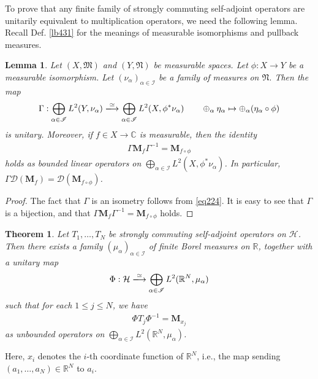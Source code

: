 \documentclass[12pt,b5paper,notitlepage]{article}
\theoremstyle{definition}
\theoremstyle{plain}
\newtheorem{thm}[df]{Theorem}
\newtheorem{lm}[df]{Lemma}
\newcommand{\fk}{\mathfrak}
\newcommand{\Dom}{\mathscr{D}}
\newcommand{\Cbb}{\mathbb C}
\newcommand{\Rbb}{\mathbb R}
\newcommand{\MH}{\mathcal H}
\newcommand{\SI}{\mathscr I}
\newcommand{\Mbf}{\mathbf M}
\numberwithin{equation}{section}
\begin{document}
To prove that any finite family of strongly commuting self-adjoint operators are unitarily equivalent to multiplication operators, we need the following lemma. Recall Def. \ref{lb431} for the meanings of measurable isomorphisms and pullback measures.


\begin{lm}\label{lb432}
Let $(X,\fk M)$ and $(Y,\fk N)$ be measurable spaces. Let $\phi:X\rightarrow Y$ be a measurable isomorphism. Let $(\nu_\alpha)_{\alpha\in\SI}$ be a family of measures on $\fk N$. Then the map
\begin{align*}
\Gamma:\bigoplus_{\alpha\in\SI}L^2(Y,\nu_\alpha)\xlongrightarrow{\simeq}\bigoplus_{\alpha\in\SI}L^2(X,\phi^*\nu_\alpha)\qquad \oplus_\alpha\eta_\alpha\mapsto \oplus_\alpha (\eta_\alpha\circ\phi)
\end{align*}
is unitary. Moreover, if $f\in X\rightarrow\Cbb$ is measurable, then the identity
\begin{align*}
\Gamma\Mbf_f\Gamma^{-1}=\Mbf_{f\circ\phi}
\end{align*}
holds as bounded linear operators on $\bigoplus_{\alpha\in\SI}L^2(X,\phi^*\nu_\alpha)$. In particular, $\Gamma\Dom(\Mbf_f)=\Dom(\Mbf_{f\circ\phi})$.
\end{lm}

\begin{proof}
The fact that $\Gamma$ is an isometry follows from \eqref{eq224}. It is easy to see that $\Gamma$ is a bijection, and that $\Gamma\Mbf_f\Gamma^{-1}=\Mbf_{f\circ\phi}$ holds.
\end{proof}



\begin{thm}\label{lb436}
Let $T_1,\dots,T_N$ be strongly commuting self-adjoint operators on $\MH$. Then there exists a family $(\mu_\alpha)_{\alpha\in\SI}$ of finite Borel measures on $\Rbb$, together with a unitary map
\begin{align*}
\Phi:\MH\xlongrightarrow{\simeq}\bigoplus_{\alpha\in\SI}L^2(\Rbb^N,\mu_\alpha)
\end{align*}
such that for each $1\leq j\leq N$, we have
\begin{align}
\Phi T_j\Phi^{-1}=\Mbf_{x_j}
\end{align}
as unbounded operators on $\bigoplus_{\alpha\in\SI}L^2(\Rbb^N,\mu_\alpha)$.
\end{thm}

Here, $x_i$ denotes the $i$-th coordinate function of $\Rbb^N$, i.e., the map sending $(a_1,\dots,a_N)\in\Rbb^N$ to $a_i$.
\end{document}
